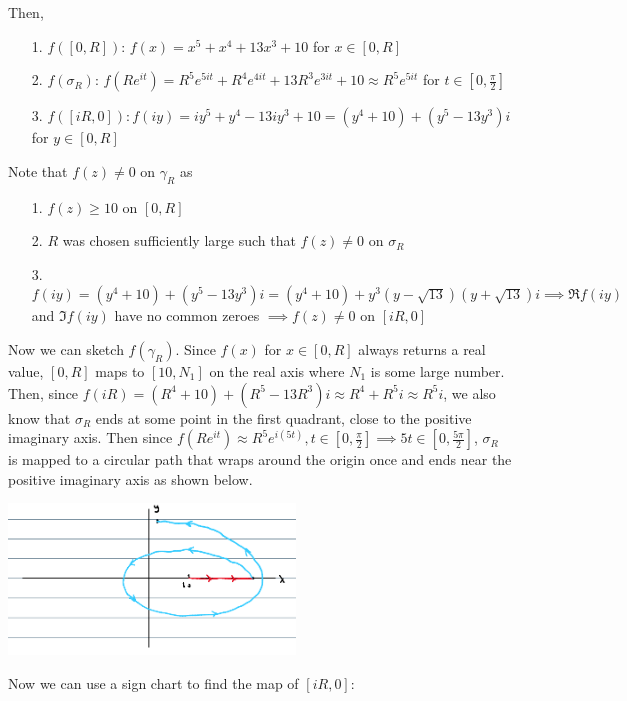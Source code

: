 \documentclass{article}
\begin{document}
\begin{itemize}
\begin{center}
            \end{center}
            Then,
            \begin{itemize}
                  \item [1.] $f([0,R])$: $f(x)=x^5+x^4+13x^3+10$ for $x\in[0,R]$
                  \item [2.] $f(\sigma_R)$: $f(Re^{it})=R^5e^{5it}+R^4e^{4it}+13R^3e^{3it}+10\approx R^5e^{5it}$ for $t\in[0,\frac{\pi}{2}]$
                  \item [3.] $f([iR,0]): f(iy)=iy^5+y^4-13iy^3+10=(y^4+10)+(y^5-13y^3)i$ for $y\in[0,R]$
            \end{itemize}
            Note that $f(z)\neq 0$ on $\gamma_R$ as
            \begin{itemize}
                  \item [1.] $f(z)\geq 10$ on $[0,R]$
                  \item [2.] $R$ was chosen sufficiently large such that $f(z)\neq 0$ on $\sigma_R$
                  \item [3.] $f(iy)=(y^4+10)+(y^5-13y^3)i=(y^4+10)+y^3(y-\sqrt{13})(y+\sqrt{13})i\implies\Re f(iy)$ and $\Im f(iy)$ have no common zeroes $\implies f(z)\neq 0$ on $[iR,0]$
            \end{itemize}
            Now we can sketch $f(\gamma_R)$. Since $f(x)$ for $x\in[0,R]$ always returns a real value, $[0,R]$ maps to $[10,N_1]$ on the real axis where $N_1$ is some large number. Then, since $f(iR)=(R^4+10)+(R^5-13R^3)i\approx R^4+R^5i\approx R^5i$, we also know that $\sigma_R$ ends at some point in the first quadrant, close to the positive imaginary axis. Then since $f(Re^{it})\approx R^5e^{i(5t)},t\in[0,\frac{\pi}{2}]\implies 5t\in[0,\frac{5\pi}{2}]$, $\sigma_R$ is mapped to a circular path that wraps around the origin once and ends near the positive imaginary axis as shown below.
            \begin{center}
                  \includegraphics[width=3in]{p1-2.png}
            \end{center}
            Now we can use a sign chart to find the map of $[iR,0]$:
            \begin{center}

\end{center}
\end{itemize}
\end{document}
